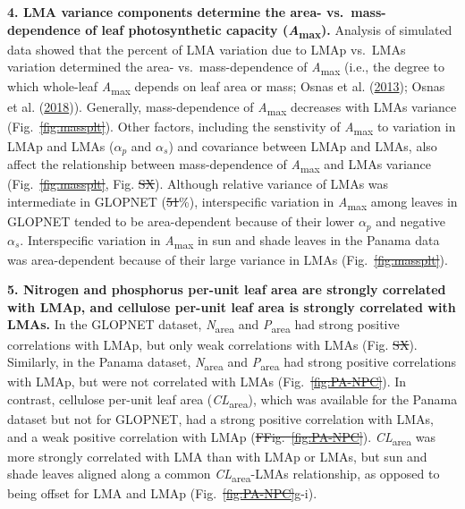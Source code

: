 \documentclass[
  12pt,
  a4paper,
,tablecaptionabove
]{scrartcl}
\providecommand{\DIFaddtex}[1]{{\protect\color{blue}\uwave{#1}}} %
\providecommand{\DIFdeltex}[1]{{\protect\color{red}\sout{#1}}}                      %
\providecommand{\DIFaddbegin}{} %
\providecommand{\DIFaddend}{} %
\providecommand{\DIFdelbegin}{} %
\providecommand{\DIFdelend}{} %
\providecommand{\DIFadd}[1]{\texorpdfstring{\DIFaddtex{#1}}{#1}} %
\providecommand{\DIFdel}[1]{\texorpdfstring{\DIFdeltex{#1}}{}} %
\newcommand{\DIFscaledelfig}{0.5}
\newlength{\DIFdelgraphicswidth} %
\newlength{\DIFdelgraphicsheight} %
\newcommand{\DIFaddincludegraphics}[2][]{{\color{blue}\fbox{\DIFOincludegraphics[#1]{#2}}}} %
\newcommand{\DIFdelincludegraphics}[2][]{%
\sbox{\DIFdelgraphicsbox}{\DIFOincludegraphics[#1]{#2}}%
\settoboxwidth{\DIFdelgraphicswidth}{\DIFdelgraphicsbox} %
\settoboxtotalheight{\DIFdelgraphicsheight}{\DIFdelgraphicsbox} %
\scalebox{\DIFscaledelfig}{%
\parbox[b]{\DIFdelgraphicswidth}{\usebox{\DIFdelgraphicsbox}\\[-\baselineskip] \rule{\DIFdelgraphicswidth}{0em}}\llap{\resizebox{\DIFdelgraphicswidth}{\DIFdelgraphicsheight}{%
\setlength{\unitlength}{\DIFdelgraphicswidth}%
\begin{picture}(1,1)%
\thicklines\linethickness{2pt} %
{\color[rgb]{1,0,0}\put(0,0){\framebox(1,1){}}}%
{\color[rgb]{1,0,0}\put(0,0){\line( 1,1){1}}}%
{\color[rgb]{1,0,0}\put(0,1){\line(1,-1){1}}}%
\end{picture}%
}\hspace*{3pt}}} %
} %
\DeclareRobustCommand{\DIFaddbegin}{\DIFOaddbegin \let\includegraphics\DIFaddincludegraphics} %
\DeclareRobustCommand{\DIFaddend}{\DIFOaddend \let\includegraphics\DIFOincludegraphics} %
\DeclareRobustCommand{\DIFdelbegin}{\DIFOdelbegin \let\includegraphics\DIFdelincludegraphics} %
\DeclareRobustCommand{\DIFdelend}{\DIFOaddend \let\includegraphics\DIFOincludegraphics} %
\begin{document}
\textbf{4. LMA variance components determine the area-
vs.~mass-dependence of leaf photosynthetic capacity
(\emph{A}\textsubscript{max}).} Analysis of simulated data showed that
the percent of LMA variation due to LMAp vs.~LMAs variation determined
the area- vs.~mass-dependence of \emph{A}\textsubscript{max} (i.e., the
degree to which whole-leaf \emph{A}\textsubscript{max} depends on leaf
area or mass; Osnas et al. (\protect\hyperlink{ref-Osnas2013}{2013});
Osnas et al. (\protect\hyperlink{ref-Osnas2018}{2018})). Generally,
mass-dependence of \emph{A}\textsubscript{max} decreases with LMAs
variance (Fig.~\DIFdelbegin \DIFdel{\ref{fig:massplt}}\DIFdelend \DIFaddbegin \DIFadd{\ref{fig-massplt}}\DIFaddend ). Other factors, including the
senstivity of \emph{A}\textsubscript{max} to variation in LMAp and LMAs
(\(\alpha_p\) and \(\alpha_s\)) and covariance between LMAp and LMAs,
also affect the relationship between mass-dependence of
\emph{A}\textsubscript{max} and LMAs variance (Fig.~\DIFdelbegin \DIFdel{\ref{fig:massplt}}\DIFdelend \DIFaddbegin \DIFadd{\ref{fig-massplt}}\DIFaddend ,
Fig. \DIFdelbegin \DIFdel{SX}\DIFdelend \DIFaddbegin \DIFadd{S\ref{fig-mass_prop_sim}-\ref{fig-mass_prop_comp}}\DIFaddend ). Although
relative variance of LMAs was intermediate in GLOPNET (\DIFdelbegin \DIFdel{51}\DIFdelend \DIFaddbegin \DIFadd{51.6}\DIFaddend \%),
interspecific variation in \emph{A}\textsubscript{max} among leaves in
GLOPNET tended to be area-dependent because of their lower \(\alpha_p\)
and negative \(\alpha_s\). Interspecific variation in
\emph{A}\textsubscript{max} in sun and shade leaves in the Panama data
was area-dependent because of their large variance in LMAs
(Fig.~\DIFdelbegin \DIFdel{\ref{fig:massplt}}\DIFdelend \DIFaddbegin \DIFadd{\ref{fig-massplt}}\DIFaddend ).

\textbf{5. Nitrogen and phosphorus per-unit leaf area are strongly
correlated with LMAp, and cellulose per-unit leaf area is strongly
correlated with LMAs.} In the GLOPNET dataset,
\emph{N}\textsubscript{area} and \emph{P}\textsubscript{area} had strong
positive correlations with LMAp, but only weak correlations with LMAs
(Fig. \DIFdelbegin \DIFdel{SX}\DIFdelend \DIFaddbegin \DIFadd{S\ref{fig-glnp}}\DIFaddend ). Similarly, in the Panama dataset,
\emph{N}\textsubscript{area} and \emph{P}\textsubscript{area} had strong
positive correlations with LMAp, but were not correlated with LMAs
(Fig.~\DIFdelbegin \DIFdel{\ref{fig:PA-NPC}}\DIFdelend \DIFaddbegin \DIFadd{\ref{fig-PA-NPC}}\DIFaddend ). In contrast, cellulose per-unit leaf area
(\emph{CL}\textsubscript{area}), which was available for the Panama
dataset but not for GLOPNET, had a strong positive correlation with
LMAs, and a weak positive correlation with LMAp (\DIFdelbegin \DIFdel{FFig.~\ref{fig:PA-NPC}}\DIFdelend \DIFaddbegin \DIFadd{Fig.~\ref{fig-PA-NPC}}\DIFaddend ).
\emph{CL}\textsubscript{area} was more strongly correlated with LMA than
with LMAp or LMAs, but sun and shade leaves aligned along a common
\emph{CL}\textsubscript{area}-LMAs relationship, as opposed to being
offset for LMA and LMAp (Fig.~\DIFdelbegin \DIFdel{\ref{fig:PA-NPC}}\DIFdelend \DIFaddbegin \DIFadd{\ref{fig-PA-NPC}}\DIFaddend g-i).
\end{document}
